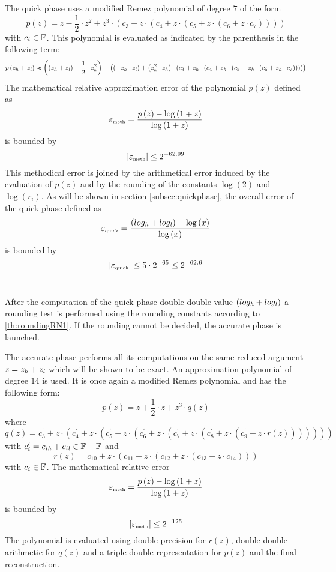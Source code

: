 The quick phase uses a modified Remez polynomial of degree $7$ of the form
$$p\left( z \right) = z - \frac{1}{2} \cdot z^2 + z^3 \cdot 
\left( c_3 + z \cdot \left( c_4 + z \cdot \left( c_5 + z \cdot \left( c_6 + z \cdot c_7 \right) \right) \right) \right)$$
with $c_i \in \F$.
This polynomial is evaluated as indicated by the parenthesis in the following term: 
$$p\left( z_\hi + z_\lo \right) \approx \left( \left(z_\hi + z_\lo \right) - \frac{1}{2} \cdot  z_\hi^2\right) + 
\left( \left( - z_\hi \cdot z_\lo \right) + 
\left(z_\hi^2 \cdot z_\hi \right) \cdot 
\left( c_3 + z_\hi \cdot \left( c_4 + z_\hi \cdot \left( c_5 + z_\hi \cdot \left( c_6 + z_\hi \cdot c_7 \right) \right) \right) \right) \right)$$
The mathematical relative approximation error of the polynomial $p\left( z \right)$ defined as
$$\epsilon_{\mbox{\tiny meth}} = \frac{p\left( z \right) - \log\left( 1 + z \right)}{\log\left(1 + z \right)}$$ is bounded by
$$\left \vert \epsilon_{\mbox{\tiny meth}} \right \vert \leq 2^{-62.99}$$
This methodical error is joined by the arithmetical error induced by the evaluation of $p\left( z \right)$ 
and by the rounding of the constants $\log\left( 2 \right)$ and $\log\left( r_i \right)$. 
As will be shown in section \ref{subsec:quickphase}, the overall error of the quick phase defined as
$$\epsilon_{\mbox{\tiny quick}} = \frac{\left(log_\hi + log_\lo\right) - \log\left(x\right)}{\log\left(x\right)}$$
is bounded by
$$\left \vert \epsilon_{\mbox{\tiny quick}} \right \vert \leq 5 \cdot 2^{-65} \leq 2^{-62.6}$$ ~ \par
After the computation of the quick phase double-double value $\left( log_\hi + log_\lo \right)$ a rounding test is performed
using the rounding constants according to \ref{th:roundingRN1}. If the rounding cannot be decided, the accurate 
phase is launched. \par
The accurate phase performs all its computations on the same reduced argument $z = z_\hi + z_\lo$ which will be shown to be 
exact. An approximation polynomial of degree $14$ is used. It is once again a modified Remez polynomial and has the 
following form:
$$p\left( z \right) = z + \frac{1}{2} \cdot z + z^3 \cdot q\left( z \right)$$
where 
$$q\left( z \right) = 
c^\prime_3 + z \cdot \left( 
c^\prime_4 + z \cdot \left( 
c^\prime_5 + z \cdot \left( 
c^\prime_6 + z \cdot \left( 
c^\prime_7 + z \cdot \left( 
c^\prime_8 + z \cdot \left( 
c^\prime_9 + z \cdot r\left( z \right) \right) \right) \right) \right) \right) \right)$$
with
$c^\prime_i = c_{i\hi} + c_{i\lo} \in \F + \F$ and
$$r\left( z \right) = 
c_{10} + z \cdot \left(
c_{11} + z \cdot \left(
c_{12} + z \cdot \left(
c_{13} + z \cdot c_{14} \right) \right) \right)$$
with $c_i \in \F$.
The mathematical relative error 
$$\epsilon_{\mbox{\tiny meth}} = \frac{p\left( z \right) - \log\left( 1 + z \right)}{\log\left( 1 + z \right)}$$
is bounded by
$$\left \vert \epsilon_{\mbox{\tiny meth}} \right \vert \leq  2^{-125}$$
The polynomial is evaluated using double precision for $r\left( z \right)$, double-double arithmetic for
$q\left( z \right)$ and a triple-double representation for $p\left( z \right)$ and the final reconstruction.

